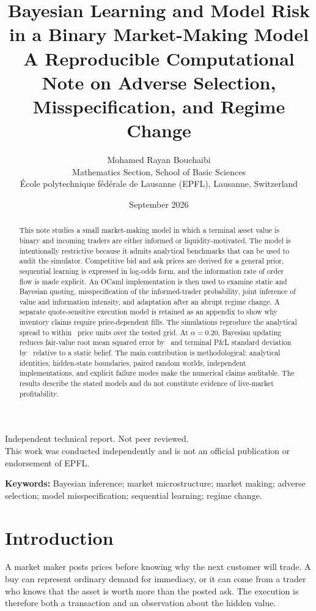 \documentclass[11pt]{article}
\title{Bayesian Learning and Model Risk in a Binary Market-Making Model\\
\large A Reproducible Computational Note on Adverse Selection, Misspecification, and Regime Change}
\author{Mohamed Rayan Bouchaibi\\
\small Mathematics Section, School of Basic Sciences\\
\small \'Ecole polytechnique f\'ed\'erale de Lausanne (EPFL), Lausanne, Switzerland}
\date{September 2026}
\begin{document}
\maketitle

\begin{center}
\small Independent technical report. Not peer reviewed.\\
\small This work was conducted independently and is not an official publication or endorsement of EPFL.
\end{center}

\begin{abstract}
This note studies a small market-making model in which a terminal asset value is binary and incoming traders are either informed or liquidity-motivated. The model is intentionally restrictive because it admits analytical benchmarks that can be used to audit the simulator. Competitive bid and ask prices are derived for a general prior, sequential learning is expressed in log-odds form, and the information rate of order flow is made explicit. An OCaml implementation is then used to examine static and Bayesian quoting, misspecification of the informed-trader probability, joint inference of value and information intensity, and adaptation after an abrupt regime change. A separate quote-sensitive execution model is retained as an appendix to show why inventory claims require price-dependent fills. The simulations reproduce the analytical spread to within \SpreadMaxError\ price units over the tested grid. At $\alpha=0.20$, Bayesian updating reduces fair-value root mean squared error by \RmseDropAtTwenty\ and terminal P\&L standard deviation by \PnlSdDropAtTwenty\ relative to a static belief. The main contribution is methodological: analytical identities, hidden-state boundaries, paired random worlds, independent implementations, and explicit failure modes make the numerical claims auditable. The results describe the stated models and do not constitute evidence of live-market profitability.
\end{abstract}

\noindent\textbf{Keywords:} Bayesian inference; market microstructure; market making; adverse selection; model misspecification; sequential learning; regime change.

\section{Introduction}

A market maker posts prices before knowing why the next customer will trade. A buy can represent ordinary demand for immediacy, or it can come from a trader who knows that the asset is worth more than the posted ask. The execution is therefore both a transaction and an observation about the hidden value.
\end{document}
